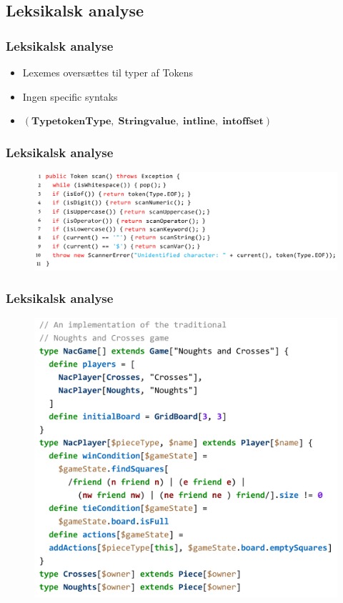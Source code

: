 \subsection{Leksikalsk analyse}
\begin{frame}
  \frametitle{Leksikalsk analyse}

  \begin{itemize}
    \item Lexemes oversættes til typer af Tokens
    \item Ingen specific syntaks
    \item $(\mathbf{Type tokenType},\; \mathbf{String value},\; \mathbf{int line},\; \mathbf{int offset})$
  \end{itemize}

\end{frame}

\begin{frame}
  \frametitle{Leksikalsk analyse}

  \begin{figure}
    \includegraphics[width=0.8\linewidth]{billeder/scan-metode}
  \end{figure}

\end{frame}



\begin{frame}
  \frametitle{Leksikalsk analyse}

  \begin{figure}
    \includegraphics[width=0.8\linewidth]{billeder/leksikalsk-eksempel}
  \end{figure}

\end{frame}

